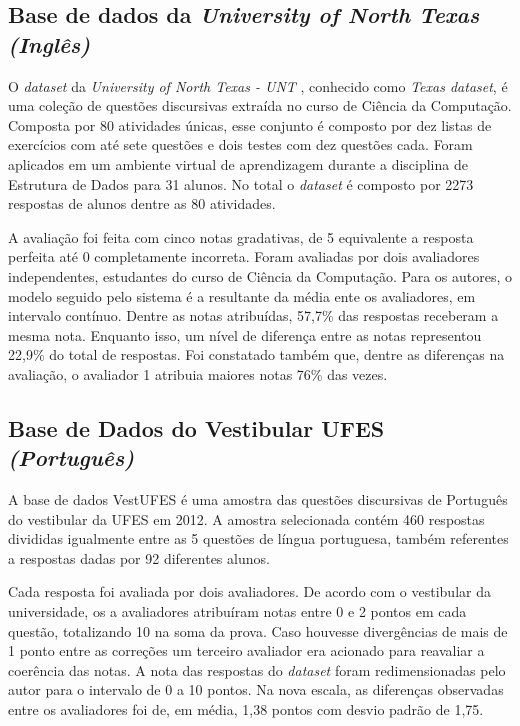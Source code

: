 \subsection{Base de dados da \textit{University of North Texas} \textit{(Inglês)}}
\label{ntexasunv-db}

O \textit{dataset} da \textit{University of North Texas - UNT} \cite{mohler2011}, conhecido como \textit{Texas dataset}, é uma coleção de questões discursivas extraída no curso de Ciência da Computação. Composta por 80 atividades únicas, esse conjunto é composto por dez listas de exercícios com até sete questões e dois testes com dez questões cada. Foram aplicados em um ambiente virtual de aprendizagem durante a disciplina de Estrutura de Dados para 31 alunos. No total o \textit{dataset} é composto por 2273 respostas de alunos dentre as 80 atividades.

A avaliação foi feita com cinco notas gradativas, de 5 equivalente a resposta perfeita até 0 completamente incorreta. Foram avaliadas por dois avaliadores independentes, estudantes do curso de Ciência da Computação. Para os autores, o modelo seguido pelo sistema é a resultante da média ente os avaliadores, em intervalo contínuo. Dentre as notas atribuídas, 57,7\% das respostas receberam a mesma nota. Enquanto isso, um nível de diferença entre as notas representou 22,9\% do total de respostas. Foi constatado também que, dentre as diferenças na avaliação, o avaliador 1 atribuia maiores notas 76\% das vezes.

\subsection{Base de Dados do Vestibular UFES \textit{(Português)}}
\label{vest-ufes-db}

A base de dados VestUFES \cite{pissinati2014} é uma amostra das questões discursivas de Português do vestibular da UFES em 2012. A amostra selecionada contém 460 respostas divididas igualmente entre as 5 questões de língua portuguesa, também referentes a respostas dadas por 92 diferentes alunos.

Cada resposta foi avaliada por dois avaliadores. De acordo com o vestibular da universidade, os a avaliadores atribuíram notas entre 0 e 2 pontos em cada questão, totalizando 10 na soma da prova. Caso houvesse divergências de mais de 1 ponto entre as correções um terceiro avaliador era acionado para reavaliar a coerência das notas. A nota das respostas do \textit{dataset} foram redimensionadas pelo autor para o intervalo de 0 a 10 pontos. Na nova escala, as diferenças observadas entre os avaliadores foi de, em média, 1,38 pontos com desvio padrão de 1,75.

